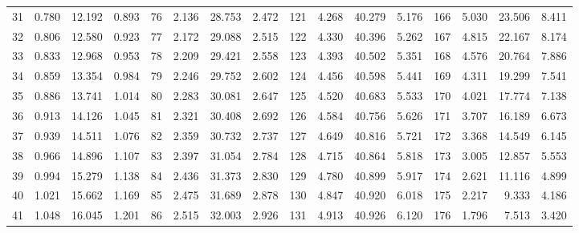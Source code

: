 \begin{table}
{\begin{tabular}{rrrr|rrrr|rrrr|rrrr}
 31 & \tiny{  0.780} &  12.192 & \tiny{  0.893} &  76 & \tiny{  2.136} &  28.753 & \tiny{  2.472} & 121 & \tiny{  4.268} &  40.279 & \tiny{  5.176} & 166 & \tiny{  5.030} &  23.506 & \tiny{  8.411}\\
 32 & \tiny{  0.806} &  12.580 & \tiny{  0.923} &  77 & \tiny{  2.172} &  29.088 & \tiny{  2.515} & 122 & \tiny{  4.330} &  40.396 & \tiny{  5.262} & 167 & \tiny{  4.815} &  22.167 & \tiny{  8.174}\\
 33 & \tiny{  0.833} &  12.968 & \tiny{  0.953} &  78 & \tiny{  2.209} &  29.421 & \tiny{  2.558} & 123 & \tiny{  4.393} &  40.502 & \tiny{  5.351} & 168 & \tiny{  4.576} &  20.764 & \tiny{  7.886}\\
 34 & \tiny{  0.859} &  13.354 & \tiny{  0.984} &  79 & \tiny{  2.246} &  29.752 & \tiny{  2.602} & 124 & \tiny{  4.456} &  40.598 & \tiny{  5.441} & 169 & \tiny{  4.311} &  19.299 & \tiny{  7.541}\\
 35 & \tiny{  0.886} &  13.741 & \tiny{  1.014} &  80 & \tiny{  2.283} &  30.081 & \tiny{  2.647} & 125 & \tiny{  4.520} &  40.683 & \tiny{  5.533} & 170 & \tiny{  4.021} &  17.774 & \tiny{  7.138}\\
 36 & \tiny{  0.913} &  14.126 & \tiny{  1.045} &  81 & \tiny{  2.321} &  30.408 & \tiny{  2.692} & 126 & \tiny{  4.584} &  40.756 & \tiny{  5.626} & 171 & \tiny{  3.707} &  16.189 & \tiny{  6.673}\\
 37 & \tiny{  0.939} &  14.511 & \tiny{  1.076} &  82 & \tiny{  2.359} &  30.732 & \tiny{  2.737} & 127 & \tiny{  4.649} &  40.816 & \tiny{  5.721} & 172 & \tiny{  3.368} &  14.549 & \tiny{  6.145}\\
 38 & \tiny{  0.966} &  14.896 & \tiny{  1.107} &  83 & \tiny{  2.397} &  31.054 & \tiny{  2.784} & 128 & \tiny{  4.715} &  40.864 & \tiny{  5.818} & 173 & \tiny{  3.005} &  12.857 & \tiny{  5.553}\\
 39 & \tiny{  0.994} &  15.279 & \tiny{  1.138} &  84 & \tiny{  2.436} &  31.373 & \tiny{  2.830} & 129 & \tiny{  4.780} &  40.899 & \tiny{  5.917} & 174 & \tiny{  2.621} &  11.116 & \tiny{  4.899}\\
 40 & \tiny{  1.021} &  15.662 & \tiny{  1.169} &  85 & \tiny{  2.475} &  31.689 & \tiny{  2.878} & 130 & \tiny{  4.847} &  40.920 & \tiny{  6.018} & 175 & \tiny{  2.217} &   9.333 & \tiny{  4.186}\\
 41 & \tiny{  1.048} &  16.045 & \tiny{  1.201} &  86 & \tiny{  2.515} &  32.003 & \tiny{  2.926} & 131 & \tiny{  4.913} &  40.926 & \tiny{  6.120} & 176 & \tiny{  1.796} &   7.513 & \tiny{  3.420}\\

\end{tabular}}
\end{table}
